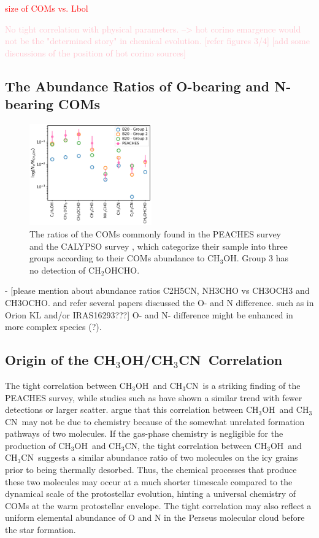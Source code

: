 \documentclass[twocolumn]{aastex62}
\newcommand{\methanol}{\mbox{CH$_{3}$OH}}
\newcommand{\methylcyanide}{\mbox{CH$_{3}$CN}}
\newcommand{\glycolaldehyde}{\mbox{CH$_{2}$OHCHO}}
\begin{document}
\textcolor{red}{size of COMs vs. Lbol}

\textcolor{pink}{No tight correlation with physical parameters.  --> hot corino emargence would not be the "determined story" in chemical evolution.  [refer figures 3/4]
[add some discussions of the position of hot corino sources]}

\subsection{The Abundance Ratios of O-bearing and N-bearing COMs}
\label{sec:ratios}

\begin{figure}[htbp!]
  \centering
  \includegraphics[width=0.47\textwidth]{ratios_survey.pdf}
  \caption{The ratios of the COMs commonly found in the PEACHES survey and the CALYPSO survey \citep{2020A&A...635A.198B}, which categorize their sample into three groups according to their COMs abundance to \methanol.  Group 3 has no detection of \glycolaldehyde.}
  \label{fig:ratio_calypso}
\end{figure}

- [please mention about abundance ratios C2H5CN, NH3CHO vs CH3OCH3 and CH3OCHO. and refer several papers discussed the O- and N difference.  such as in Orion KL and/or IRAS16293???] O- and N- difference might be enhanced in more complex species (?).

\subsection{Origin of the \methanol/\methylcyanide\ Correlation}
The tight correlation between \methanol\ and \methylcyanide\ is a striking finding of the PEACHES survey, while studies such as \citet{2017ApJ...841..120B,2020A&A...635A.198B} have shown a similar trend with fewer detections or larger scatter.  \citet{2020A&A...635A.198B} argue that this correlation between \methanol\ and \methylcyanide\ may not be due to chemistry because of the somewhat unrelated formation pathways of two molecules.  If the gas-phase chemistry is negligible for the production of \methanol\ and \methylcyanide, the tight correlation between \methanol\ and \methylcyanide\ suggests a similar abundance ratio of two molecules on the icy grains prior to being thermally desorbed.  Thus, the chemical processes that produce these two molecules may occur at a much shorter timescale compared to the dynamical scale of the protostellar evolution, hinting a universal chemistry of COMs at the warm protostellar envelope.  The tight correlation may also reflect a uniform elemental abundance of O and N in the Perseus molecular cloud before the star formation.
\end{document}
